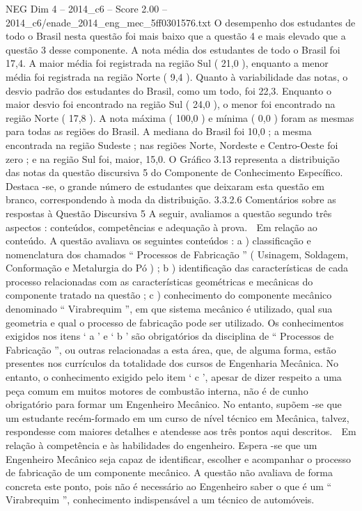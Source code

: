 \begin{textsample}{NEG Dim 4 – 2014\_c6 – Score 2.00 – 2014\_c6/enade\_2014\_eng\_mec\_5ff0301576.txt}
O desempenho dos estudantes de todo o Brasil nesta questão foi mais baixo que a questão 4 e mais elevado que a questão 3 desse componente.
A nota média dos estudantes de todo o Brasil foi 17,4.
A maior média foi registrada na região Sul ( 21,0 ), enquanto a menor média foi registrada na região Norte ( 9,4 ).
Quanto à variabilidade das notas, o desvio padrão dos estudantes do Brasil, como um todo, foi 22,3.
Enquanto o maior desvio foi encontrado na região Sul ( 24,0 ), o menor foi encontrado na região Norte ( 17,8 ).
A nota máxima ( 100,0 ) e mínima ( 0,0 ) foram as mesmas para todas as regiões do Brasil.
A mediana do Brasil foi 10,0 ; a mesma encontrada na região Sudeste ; nas regiões Norte, Nordeste e Centro-Oeste foi zero ; e na região Sul foi, maior, 15,0.
O Gráfico 3.13 representa a distribuição das notas da questão discursiva 5 do Componente de Conhecimento Específico.
Destaca -se, o grande número de estudantes que deixaram esta questão em branco, correspondendo à moda da distribuição. 3.3.2.6 Comentários sobre as respostas à Questão Discursiva 5 A seguir, avaliamos a questão segundo três aspectos : conteúdos, competências e adequação à prova.  Em relação ao conteúdo.
A questão avaliava os seguintes conteúdos : a ) classificação e nomenclatura dos chamados “ Processos de Fabricação ” ( Usinagem, Soldagem, Conformação e Metalurgia do Pó ) ; b ) identificação das características de cada processo relacionadas com as características geométricas e mecânicas do componente tratado na questão ; c ) conhecimento do componente mecânico denominado “ Virabrequim ”, em que sistema mecânico é utilizado, qual sua geometria e qual o processo de fabricação pode ser utilizado.
Os conhecimentos exigidos nos itens ‘ a ’ e ‘ b ’ são obrigatórios da disciplina de “ Processos de Fabricação ”, ou outras relacionadas a esta área, que, de alguma forma, estão presentes nos currículos da totalidade dos cursos de Engenharia Mecânica.
No entanto, o conhecimento exigido pelo item ‘ c ’, apesar de dizer respeito a uma peça comum em muitos motores de combustão interna, não é de cunho obrigatório para formar um Engenheiro Mecânico.
No entanto, supõem -se que um estudante recém-formado em um curso de nível técnico em Mecânica, talvez, respondesse com maiores detalhes e atendesse aos três pontos aqui descritos.  Em relação à competência e às habilidades do engenheiro.
Espera -se que um Engenheiro Mecânico seja capaz de identificar, escolher e acompanhar o processo de fabricação de um componente mecânico.
A questão não avaliava de forma concreta este ponto, pois não é necessário ao Engenheiro saber o que é um “ Virabrequim ”, conhecimento indispensável a um técnico de automóveis.

\end{textsample}
